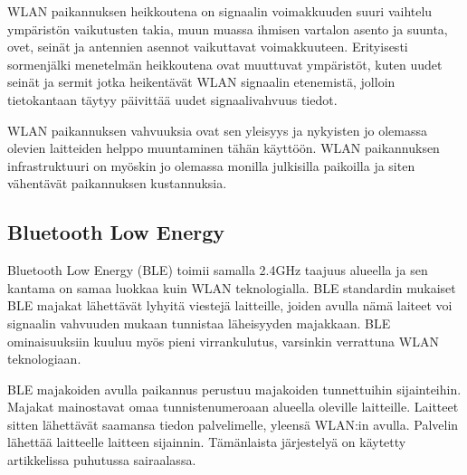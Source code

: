 WLAN paikannuksen heikkoutena on signaalin voimakkuuden suuri vaihtelu ympäristön vaikutusten takia\cite{B,G}, muun muassa ihmisen vartalon asento ja suunta, ovet, seinät ja antennien asennot vaikuttavat voimakkuuteen. Erityisesti sormenjälki menetelmän heikkoutena ovat muuttuvat ympäristöt, kuten uudet seinät ja sermit jotka heikentävät WLAN signaalin etenemistä, jolloin tietokantaan täytyy päivittää uudet signaalivahvuus tiedot.

WLAN paikannuksen vahvuuksia ovat sen yleisyys ja nykyisten jo olemassa olevien laitteiden helppo muuntaminen tähän käyttöön\cite{G}. WLAN paikannuksen infrastruktuuri on myöskin jo olemassa monilla julkisilla paikoilla ja siten vähentävät paikannuksen kustannuksia\cite{A,B}.
\subsection{Bluetooth Low Energy}%
Bluetooth Low Energy (BLE) toimii samalla 2.4GHz taajuus alueella ja sen kantama on samaa luokkaa kuin WLAN teknologialla\cite{BLE,B}. BLE standardin mukaiset BLE majakat lähettävät lyhyitä viestejä laitteille, joiden avulla nämä laiteet voi signaalin vahvuuden mukaan tunnistaa läheisyyden majakkaan. BLE ominaisuuksiin kuuluu myös pieni virrankulutus, varsinkin verrattuna WLAN teknologiaan\cite{ibeacon}.

BLE majakoiden avulla paikannus perustuu majakoiden tunnettuihin sijainteihin. Majakat mainostavat omaa tunnistenumeroaan alueella oleville laitteille. Laitteet sitten lähettävät saamansa tiedon palvelimelle, yleensä WLAN:in avulla. Palvelin lähettää laitteelle laitteen sijainnin. Tämänlaista järjestelyä on käytetty artikkelissa\cite{ibeacon} puhutussa sairaalassa.

